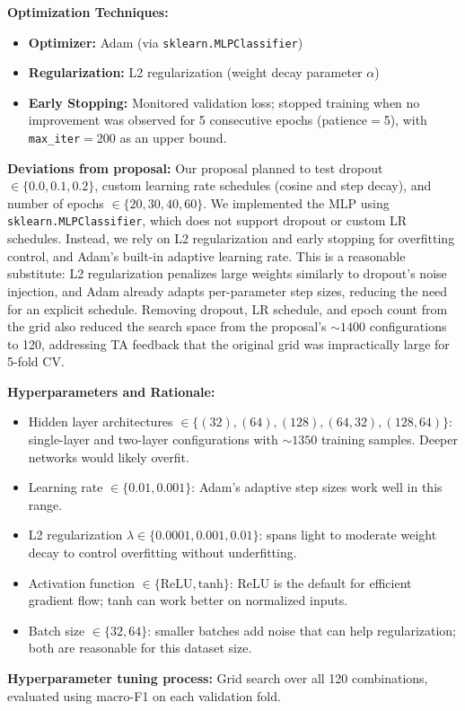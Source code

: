 \documentclass[12pt]{article}
\begin{document}
\textbf{Optimization Techniques:}
    \begin{itemize}
        \item \textbf{Optimizer:} Adam (via \texttt{sklearn.MLPClassifier})
        \item \textbf{Regularization:} L2 regularization (weight decay parameter $\alpha$)
        \item \textbf{Early Stopping:} Monitored validation loss; stopped training when no improvement was observed for 5 consecutive epochs (patience$=$5), with \texttt{max\_iter}$=$200 as an upper bound.
    \end{itemize}

\textbf{Deviations from proposal:} Our proposal planned to test dropout $\in \{0.0, 0.1, 0.2\}$, custom learning rate schedules (cosine and step decay), and number of epochs $\in \{20, 30, 40, 60\}$. We implemented the MLP using \texttt{sklearn.MLPClassifier}, which does not support dropout or custom LR schedules. Instead, we rely on L2 regularization and early stopping for overfitting control, and Adam's built-in adaptive learning rate. This is a reasonable substitute: L2 regularization penalizes large weights similarly to dropout's noise injection, and Adam already adapts per-parameter step sizes, reducing the need for an explicit schedule. Removing dropout, LR schedule, and epoch count from the grid also reduced the search space from the proposal's ${\sim}1400$ configurations to 120, addressing TA feedback that the original grid was impractically large for 5-fold CV.

\textbf{Hyperparameters and Rationale:}
    \begin{itemize}
        \item Hidden layer architectures $\in \{(32), (64), (128), (64{,}32), (128{,}64)\}$: single-layer and two-layer configurations with ${\sim}1350$ training samples. Deeper networks would likely overfit.
        \item Learning rate $\in \{0.01, 0.001\}$: Adam's adaptive step sizes work well in this range.
        \item L2 regularization $\lambda \in \{0.0001, 0.001, 0.01\}$: spans light to moderate weight decay to control overfitting without underfitting.
        \item Activation function $\in \{\text{ReLU}, \text{tanh}\}$: ReLU is the default for efficient gradient flow; tanh can work better on normalized inputs.
        \item Batch size $\in \{32, 64\}$: smaller batches add noise that can help regularization; both are reasonable for this dataset size.
    \end{itemize}
\textbf{Hyperparameter tuning process:} Grid search over all 120 combinations, evaluated using macro-F1 on each validation fold.
\end{document}

